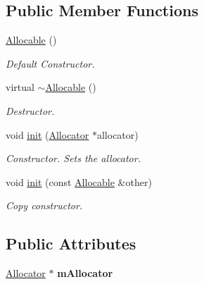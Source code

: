 \subsection*{Public Member Functions}
\begin{DoxyCompactItemize}
\item 
\hyperlink{classDE_1_1Allocable_a1f2a8d1ca61da795fd802b47e31797d0}{Allocable} ()\hypertarget{classDE_1_1Allocable_a1f2a8d1ca61da795fd802b47e31797d0}{}\label{classDE_1_1Allocable_a1f2a8d1ca61da795fd802b47e31797d0}

\begin{DoxyCompactList}\small\item\em Default Constructor. \end{DoxyCompactList}\item 
virtual \hyperlink{classDE_1_1Allocable_a5292eaaef5d8b77beb74dea9314e2fdb}{$\sim$\+Allocable} ()\hypertarget{classDE_1_1Allocable_a5292eaaef5d8b77beb74dea9314e2fdb}{}\label{classDE_1_1Allocable_a5292eaaef5d8b77beb74dea9314e2fdb}

\begin{DoxyCompactList}\small\item\em Destructor. \end{DoxyCompactList}\item 
void \hyperlink{classDE_1_1Allocable_af90aab5399c7f3f1ac3caaa3d89147b2}{init} (\hyperlink{classDE_1_1Allocator}{Allocator} $\ast$allocator)
\begin{DoxyCompactList}\small\item\em Constructor. Sets the allocator. \end{DoxyCompactList}\item 
void \hyperlink{classDE_1_1Allocable_aecef9870259c9419611aede4ac590823}{init} (const \hyperlink{classDE_1_1Allocable}{Allocable} \&other)
\begin{DoxyCompactList}\small\item\em Copy constructor. \end{DoxyCompactList}\end{DoxyCompactItemize}
\subsection*{Public Attributes}
\begin{DoxyCompactItemize}
\item 
\hyperlink{classDE_1_1Allocator}{Allocator} $\ast$ {\bfseries m\+Allocator}\hypertarget{classDE_1_1Allocable_affa37a6c4c3205ce1e2cc49fd36ef19b}{}\label{classDE_1_1Allocable_affa37a6c4c3205ce1e2cc49fd36ef19b}

\end{DoxyCompactItemize}
